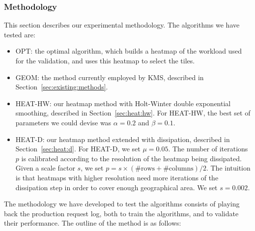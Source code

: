 \documentclass[11pt, oneside]{report}
\begin{document}
\subsubsection{Methodology}
\label{sec:methods}

This section describes our experimental methodology. The algorithms we have tested are:

\begin{itemize}

\item OPT: the optimal algorithm, which builds a heatmap of the workload used for the validation, and uses this heatmap to select the tiles. 

\item GEOM: the method currently employed by KMS, described in Section~\ref{sec:existing:methods}.

\item HEAT-HW: our heatmap method with Holt-Winter double exponential smoothing, described in Section~\ref{sec:heat:hw}. For HEAT-HW, the best set of parameters we could devise was $\alpha = 0.2$ and $\beta = 0.1$. 

\item HEAT-D: our heatmap method extended with dissipation, described in Section~\ref{sec:heat:d}. For HEAT-D, we set $\mu = 0.05$. The number of iterations $p$ is calibrated according to the resolution of the heatmap being dissipated. Given a scale factor $s$, we set $p = s \times (\text{\#rows}+\text{\#columns})/2$. The intuition is that heatmaps with higher resolution need more iterations of the dissipation step in order to cover enough geographical area. We set $s = 0.002$. 

\end{itemize}

The methodology we have developed to test the algorithms consists of playing back the production request log, both to train the algorithms, and to validate their performance. The outline of the method is as follows:
\end{document}
